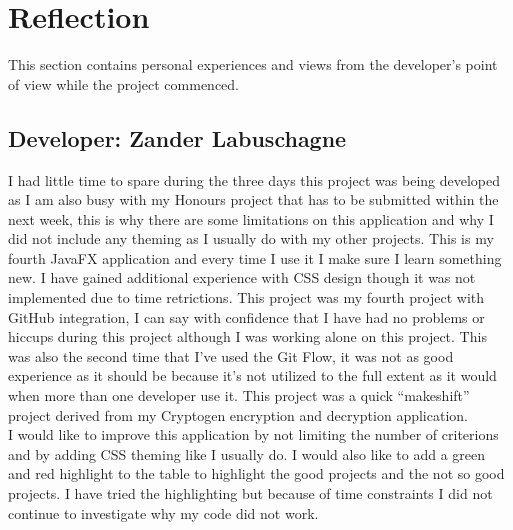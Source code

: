 \documentclass[11pt]{article}
\begin{document}
    \section{Reflection}
		This section contains personal experiences and views from the developer's point of view while the project commenced.\\
		
		\subsection{Developer: Zander Labuschagne}
			I had little time to spare during the three days this project was being developed as I am also busy with my Honours project that has to be submitted within the next week, this is why there are some limitations on this application and why I did not include any theming as I usually do with my other projects. This is my fourth JavaFX application and every time I use it I make sure I learn something new. I have gained additional experience with CSS design though it was not implemented due to time retrictions. This project was my fourth project with GitHub integration, I can say with confidence that I have had no problems or hiccups during this project although I was working alone on this project. This was also the second time that I've used the Git Flow, it was not as good experience as it should be because it's not utilized to the full extent as it would when more than one developer use it. This project was a quick ``makeshift'' project derived from my Cryptogen encryption and decryption application.\\

			I would like to improve this application by not limiting the number of criterions and by adding CSS theming like I usually do. I would also like to add a green and red highlight to the table to highlight the good projects and the not so good projects. I have tried the highlighting but because of time constraints I did not continue to investigate why my code did not work.

		\newpage
		
		
		\thispagestyle{plain}
		\clearpage
\end{document}
